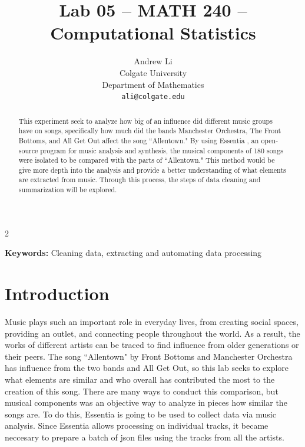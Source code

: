 \documentclass{article}\usepackage[]{graphicx}\usepackage[]{xcolor}
\begin{document}
\vspace{-1in}
\title{Lab 05 -- MATH 240 -- Computational Statistics}

\author{
  Andrew Li \\
  Colgate University  \\
  Department of Mathematics  \\
  {\tt ali@colgate.edu}
}

\date{}

\maketitle

\begin{multicols}{2}
\begin{abstract}
This experiment seek to analyze how big of an influence did different music groups have on songs, specifically how much did the bands Manchester Orchestra, The Front Bottoms, and All Get Out affect the song ``Allentown." By using Essentia \citep{bogdanov2013essentia}, an open-source program for music analysis and synthesis, the musical components of 180 songs were isolated to be compared with the parts of ``Allentown." This method would be give more depth into the analysis and provide a better understanding of what elements are extracted from music. Through this process, the steps of data cleaning and summarization will be explored.  

\end{abstract}

\noindent \textbf{Keywords:} Cleaning data, extracting and automating data processing 

\section{Introduction}

Music plays such an important role in everyday lives, from creating social spaces, providing an outlet, and connecting people throughout the world. As a result, the works of different artists can be traced to find influence from older generations or their peers. The song ``Allentown" by Front Bottoms and Manchester Orchestra has influence from the two bands and All Get Out, so this lab seeks to explore what elements are similar and who overall has contributed the most to the creation of this song. There are many ways to conduct this comparison, but musical components was an objective way to analyze in pieces how similar the songs are. To do this, Essentia \citep{bogdanov2013essentia} is going to be used to collect data via music analysis. Since Essentia allows processing on individual tracks, it became neccesary to prepare a batch of json files using the tracks from all the artists. 




\end{multicols}
\end{document}
